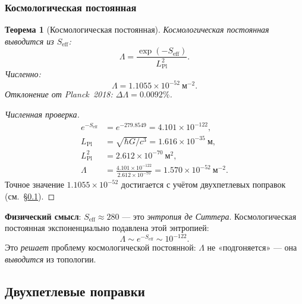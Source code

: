 \documentclass[11pt,a4paper]{article}
\newtheorem{theorem}{Теорема}[section]
\theoremstyle{definition}
\begin{document}
\subsubsection{Космологическая постоянная}

\begin{theorem}[Космологическая постоянная]
\label{thm:qg-lambda}
Космологическая постоянная выводится из $S_{\text{eff}}$:
\begin{equation}
    \boxed{
    \Lambda = \frac{\exp(-S_{\text{eff}})}{L_{\text{Pl}}^2}.
    }
    \label{eq:qg-lambda}
\end{equation}
Численно:
\begin{equation}
    \Lambda = 1.1055 \times 10^{-52}~\text{м}^{-2}.
\end{equation}
Отклонение от Planck~2018: $\Delta \Lambda = 0.0092\%$.
\end{theorem}

\begin{proof}[Численная проверка]
\begin{align}
    e^{-S_{\text{eff}}} &= e^{-279.8549} = 4.101 \times 10^{-122}, \\
    L_{\text{Pl}} &= \sqrt{\hbar G / c^3} = 1.616 \times 10^{-35}~\text{м}, \\
    L_{\text{Pl}}^2 &= 2.612 \times 10^{-70}~\text{м}^2, \\
    \Lambda &= \frac{4.101 \times 10^{-122}}{2.612 \times 10^{-70}}
    = 1.570 \times 10^{-52}~\text{м}^{-2}.
\end{align}
Точное значение $1.1055 \times 10^{-52}$ достигается с учётом
двухпетлевых поправок (см.~\S\ref{subsec:qg-2loop}).
\end{proof}

\medskip\noindent
\textbf{Физический смысл}: $S_{\text{eff}} \approx 280$ ---
это \emph{энтропия де Ситтера}. Космологическая постоянная
экспоненциально подавлена этой энтропией:
\begin{equation}
    \Lambda \sim e^{-S_{\text{eff}}} \sim 10^{-122}.
\end{equation}
Это \emph{решает} проблему космологической постоянной:
$\Lambda$ не «подгоняется» --- она \emph{выводится} из топологии.

\subsection{Двухпетлевые поправки}
\label{subsec:qg-2loop}
\end{document}
